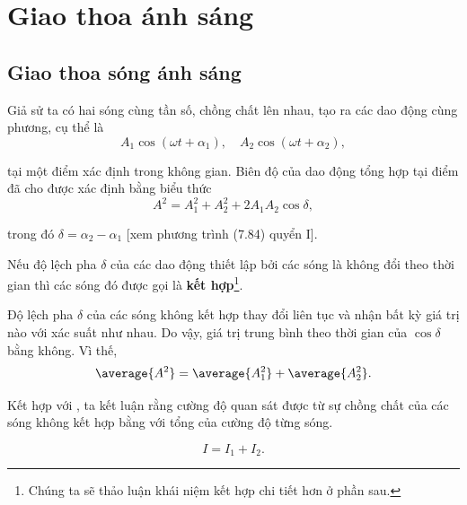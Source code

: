 

\chapter[Giao thoa ánh sáng]{Giao thoa ánh sáng}\label{chap:17}

\section{Giao thoa sóng ánh sáng}\label{sec:17_1}

Giả sử ta có hai sóng cùng tần số, chồng chất lên nhau, tạo ra các dao động cùng phương, cụ thể là
\begin{equation*}
    A_1 \cos(\omega t + \alpha_1),\quad A_2 \cos(\omega t + \alpha_2),
\end{equation*}

\noindent
tại một điểm xác định trong không gian.
Biên độ của dao động tổng hợp tại điểm đã cho được xác định bằng biểu thức
\begin{equation*}
    A^2 = A_1^2 + A_2^2 + 2 A_1 A_2 \cos\delta,
\end{equation*}

\noindent
trong đó $\delta=\alpha_2-\alpha_1$ [xem phương trình (7.84) quyển I].

Nếu độ lệch pha $\delta$ của các dao động thiết lập bởi các sóng là không đổi theo thời gian thì các sóng đó được gọi là \textbf{kết hợp}\footnote{Chúng ta sẽ thảo luận khái niệm kết hợp chi tiết hơn ở phần sau.}.

Độ lệch pha $\delta$ của các sóng không kết hợp thay đổi liên tục và nhận bất kỳ giá trị nào với xác suất như nhau.
Do vậy, giá trị trung bình theo thời gian của $\cos\delta$ bằng không.
Vì thế,
\begin{equation*}
    \average{A^2} = \average{A_1^2} + \average{A_2^2}.
\end{equation*}

\noindent
Kết hợp với , ta kết luận rằng cường độ quan sát được từ sự chồng chất của các sóng không kết hợp bằng với tổng của cường độ từng sóng.

\begin{equation}\label{eq:17_1}
    I = I_1 + I_2.
\end{equation}

